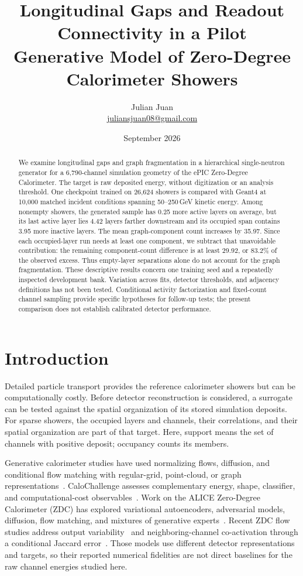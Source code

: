 \documentclass[11pt]{article}
\title{Longitudinal Gaps and Readout Connectivity in a Pilot\\Generative Model of Zero-Degree Calorimeter Showers}
\author{Julian Juan\\[3pt]\small\href{mailto:juliansjuan08@gmail.com}{juliansjuan08@gmail.com}}
\date{September 2026}
\begin{document}
\maketitle

\begin{abstract}
We examine longitudinal gaps and graph fragmentation in a hierarchical single-neutron generator for a 6,790-channel simulation geometry of the ePIC Zero-Degree Calorimeter. The target is raw deposited energy, without digitization or an analysis threshold. One checkpoint trained on 26,624 showers is compared with Geant4 at 10,000 matched incident conditions spanning 50--250\,GeV kinetic energy. Among nonempty showers, the generated sample has 0.25 more active layers on average, but its last active layer lies 4.42 layers farther downstream and its occupied span contains 3.95 more inactive layers. The mean graph-component count increases by 35.97. Since each occupied-layer run needs at least one component, we subtract that unavoidable contribution: the remaining component-count difference is at least 29.92, or 83.2\% of the observed excess. Thus empty-layer separations alone do not account for the graph fragmentation. These descriptive results concern one training seed and a repeatedly inspected development bank. Variation across fits, detector thresholds, and adjacency definitions has not been tested. Conditional activity factorization and fixed-count channel sampling provide specific hypotheses for follow-up tests; the present comparison does not establish calibrated detector performance.
\end{abstract}

\section{Introduction}

Detailed particle transport provides the reference calorimeter showers but can be computationally costly. Before detector reconstruction is considered, a surrogate can be tested against the spatial organization of its stored simulation deposits. For sparse showers, the occupied layers and channels, their correlations, and their spatial organization are part of that target. Here, support means the set of channels with positive deposit; occupancy counts its members.

Generative calorimeter studies have used normalizing flows, diffusion, and conditional flow matching with regular-grid, point-cloud, or graph representations~\cite{caloflow,calodiffusion,calograph,caloclouds2,calodream}. CaloChallenge assesses complementary energy, shape, classifier, and computational-cost observables~\cite{calochallenge,kansalmetrics}. Work on the ALICE Zero-Degree Calorimeter (ZDC) has explored variational autoencoders, adversarial models, diffusion, flow matching, and mixtures of generative experts~\cite{dubinskizdc,kitazdc,fasterzdc,expertsim,wojnar2025}. Recent ZDC flow studies address output variability~\cite{majerziaf} and neighboring-channel co-activation through a conditional Jaccard error~\cite{majerz2026}. Those models use different detector representations and targets, so their reported numerical fidelities are not direct baselines for the raw channel energies studied here.
\end{document}
